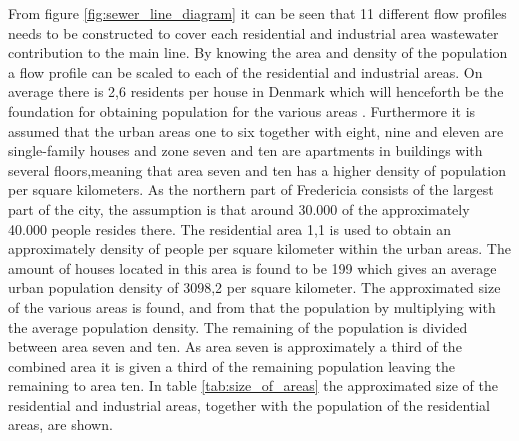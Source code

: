 From figure \ref{fig:sewer_line_diagram} it can be seen that 11 different flow profiles needs to be constructed to cover each residential and industrial area wastewater contribution to the main line. %
By knowing the area and density of the population a flow profile can be scaled to each of the residential and industrial areas. 
On average there is 2,6 residents per house in Denmark which will henceforth be the foundation for obtaining population for the various areas \cite{nykredit}. 
Furthermore it is assumed that the urban areas one to six together with eight, nine and eleven are single-family houses and zone seven and ten are apartments in buildings with several floors,meaning that area seven and ten has a higher density of population per square kilometers.
As the northern part of Fredericia consists of the largest part of the city, the assumption is that around 30.000 of the approximately 40.000 people resides there. 
The residential area 1,1 is used to obtain an approximately density of people per square kilometer within the urban areas. The amount of houses located in this area is found to be 199 which gives an average urban population density of 3098,2 per square kilometer.
The approximated size of the various areas is found, and from that the population by multiplying with the average population density. The remaining of the population is divided between area seven and ten. As area seven is approximately a third of the combined area it is given a third of the remaining population leaving the remaining to area ten.
In table \ref{tab:size_of_areas} the approximated size of the residential and industrial areas, together with the population of the residential areas, are shown. 

